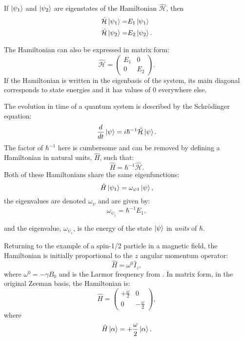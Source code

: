 If $\ket{\psi_1}$ and $\ket{\psi_2}$ are eigenstates of the Hamiltonian $\hat{\mathcal{H}}$, then
\begin{align}
  \hat{\mathcal{H}}\ket{\psi_1} =& E_1\ket{\psi_1}\\
  \hat{\mathcal{H}}\ket{\psi_2} =& E_2\ket{\psi_2}.
\end{align}

The Hamiltonian can also be expressed in matrix form:
\begin{equation}
  \hat{\mathcal{H}} = \begin{pmatrix}
    E_1 & 0\\
    0 & E_2
\end{pmatrix}.
\end{equation}
If the Hamiltonian is written in the eigenbasis of the system, its main diagonal corresponds to state energies and it has values of $0$ everywhere else.

The evolution in time of a quantum system is described by the Schr\"odinger equation:
\begin{equation}
  \frac{d}{dt}\ket{\psi} = i\hbar^{-1}\hat{\mathcal{H}}\ket{\psi}.
\end{equation}
The factor of $\hbar^{-1}$ here is cumbersome and can be removed by defining a Hamiltonian in natural units, $\hat{H}$,
such that:
\begin{equation}
  \hat{H} = \hbar^{-1}\hat{\mathcal{H}}.
\end{equation}
Both of these Hamiltonians share the same eigenfunctions:
\begin{equation}
  \hat{H}\ket{\psi_1} = \omega_{\psi1}\ket{\psi},
\end{equation}
the eigenvalues are denoted $\omega_{\psi}$ and are given by:
\begin{equation}
  \omega_{\psi_1} = \hbar^{-1}E_1,
\end{equation}

and the eigenvalue, $\omega_{\psi_1}$, is the energy of the state $\ket{\psi}$ in \textit{units} of $\hbar$.

Returning to the example of a spin-1/2 particle in a magnetic field, the Hamiltonian is initially
proportional to the $z$ angular momentum operator:
\begin{equation}
  \hat{H} = \omega^0\hat{I}_z,
\end{equation}
where $\omega^0 = -\gamma B_0$ and is the Larmor frequency from . In matrix form, in the original Zeeman basis, the Hamiltonian is:
\begin{equation}
  \hat{H} = \begin{pmatrix}
+\frac{\omega}{2} & 0\\
0 & -\frac{\omega}{2}
\end{pmatrix},
\end{equation}
where
\begin{equation}
  \hat{H}\ket{\alpha} = +\frac{\omega}{2}\ket{\alpha}.
\end{equation}

